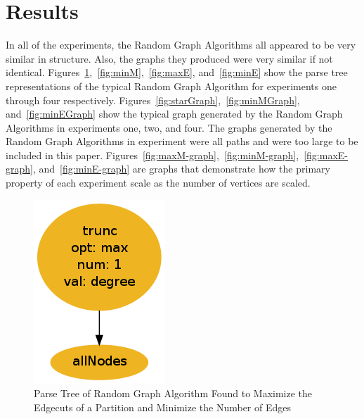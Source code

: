 \documentclass{article}
\begin{document}
\section{Results}

In all of the experiments, the Random Graph Algorithms all appeared to be very similar in structure. Also, the graphs they produced were very similar if not
identical. Figures~\ref{fig:maxM},~\ref{fig:minM},~\ref{fig:maxE}, and~\ref{fig:minE} show the parse tree representations of the typical Random Graph Algorithm
for experiments one through four respectively. Figures~\ref{fig:starGraph},~\ref{fig:minMGraph}, and~\ref{fig:minEGraph} show the typical graph generated by the
Random Graph Algorithms in experiments one, two, and four. The graphs generated by the Random Graph Algorithms in experiment were all paths and were too large to be included 
in this paper. Figures~\ref{fig:maxM-graph},~\ref{fig:minM-graph},~\ref{fig:maxE-graph}, and~\ref{fig:minE-graph} are graphs that demonstrate how the primary property of
each experiment scale as the number of vertices are scaled.


\begin{figure}
\begin{centering}
  \includegraphics[scale=0.4]{maxM.png}
  \caption{Parse Tree of Random Graph Algorithm Found to Maximize the Edgecuts of a Partition and Minimize the Number of Edges}
  \label{fig:maxM}
\end{centering}
\end{figure}
\end{document}
